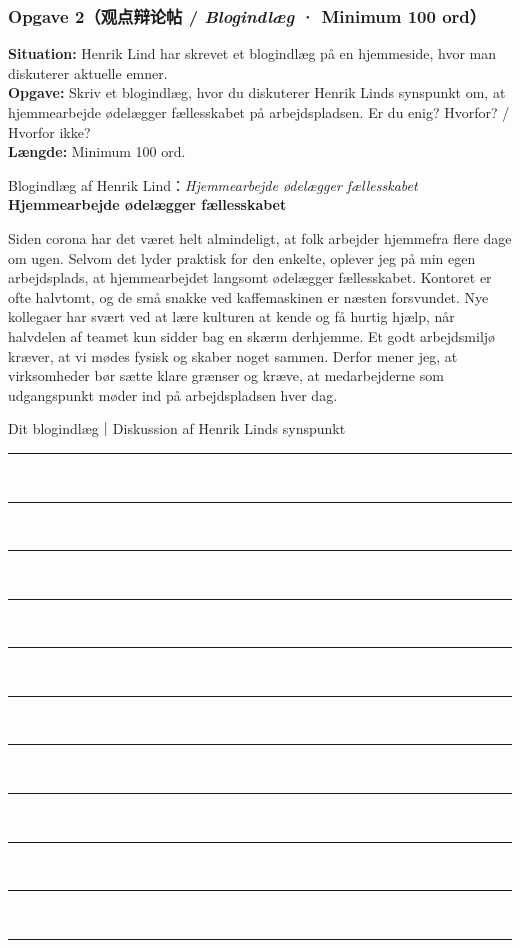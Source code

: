 \subsubsection*{Opgave 2（观点辩论帖 / \textit{Blogindlæg} · Minimum 100 ord）}

\textbf{Situation:} Henrik Lind har skrevet et blogindlæg på en hjemmeside, hvor man diskuterer aktuelle emner.\\
\textbf{Opgave:} Skriv et blogindlæg, hvor du diskuterer Henrik Linds synspunkt om, at hjemmearbejde ødelægger fællesskabet på arbejdspladsen. Er du enig? Hvorfor? / Hvorfor ikke?\\
\textbf{Længde:} Minimum 100 ord.

\begin{emailbox}{Blogindlæg af Henrik Lind：\textit{Hjemmearbejde ødelægger fællesskabet}}
\textbf{\color{NCDNavy}Hjemmearbejde ødelægger fællesskabet}

\vspace{0.3em}
Siden corona har det været helt almindeligt, at folk arbejder hjemmefra flere dage om ugen. Selvom det lyder praktisk for den enkelte, oplever jeg på min egen arbejdsplads, at hjemmearbejdet langsomt ødelægger fællesskabet. Kontoret er ofte halvtomt, og de små snakke ved kaffemaskinen er næsten forsvundet. Nye kollegaer har svært ved at lære kulturen at kende og få hurtig hjælp, når halvdelen af teamet kun sidder bag en skærm derhjemme. Et godt arbejdsmiljø kræver, at vi mødes fysisk og skaber noget sammen. Derfor mener jeg, at virksomheder bør sætte klare grænser og kræve, at medarbejderne som udgangspunkt møder ind på arbejdspladsen hver dag.
\end{emailbox}

\begin{emailbox}{Dit blogindlæg｜Diskussion af Henrik Linds synspunkt}
\vspace{0.3em}
\rule{\linewidth}{0.4pt}\\[0.55em]
\rule{\linewidth}{0.4pt}\\[0.55em]
\rule{\linewidth}{0.4pt}\\[0.55em]
\rule{\linewidth}{0.4pt}\\[0.55em]
\rule{\linewidth}{0.4pt}\\[0.55em]
\rule{\linewidth}{0.4pt}\\[0.55em]
\rule{\linewidth}{0.4pt}\\[0.55em]
\rule{\linewidth}{0.4pt}\\[0.55em]
\rule{\linewidth}{0.4pt}\\[0.55em]
\rule{\linewidth}{0.4pt}\\[0.55em]
\rule{\linewidth}{0.4pt}
\end{emailbox}

